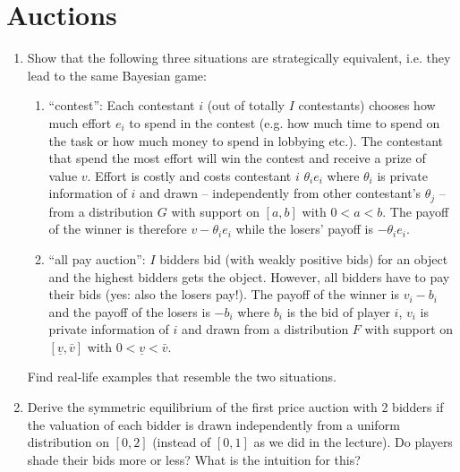 \documentclass[a4paper,12pt]{article}
\begin{document}
\section{Auctions}
\label{sec:auctions}

\begin{enumerate}
\item\label{ex:stratEq} Show that the following three situations are strategically equivalent, i.e. they lead to the same Bayesian game:
  \begin{enumerate}
  \item ``contest'': Each contestant $i$ (out of totally $I$ contestants) chooses how much effort $e_i$ to spend in the contest (e.g. how much time to spend on the task or how much money to spend in lobbying etc.). The contestant that spend the most effort will win the contest and receive a prize of value $v$. Effort is costly and costs contestant $i$ $\theta _ie_i$ where $\theta _i$ is private information of $i$ and drawn -- independently from other contestant's $\theta _j$ -- from a distribution $G$ with support on $[a,b]$ with $0<a<b$. The payoff of the winner is therefore $v-\theta _ie_i$ while the losers' payoff is $-\theta _ie_i$.
  \item ``all pay auction'': $I$ bidders bid (with weakly positive bids) for an object and the highest bidders gets the object. However, all bidders have to pay their bids (yes: also the losers pay!). The payoff of the winner is $v_i -b_i$ and the payoff of the losers is $-b_i$ where $b_i$ is the bid of player $i$, $v_i$ is private information of $i$ and drawn from a distribution $F$ with support on $[\underline{v},\bar{v}]$ with $0<\underline{v}<\bar{v}$.
  \end{enumerate}
  Find real-life examples that resemble the two situations.
\item Derive the symmetric equilibrium of the first price auction with 2 bidders if the valuation of each bidder is drawn independently from a uniform distribution on $[0,2]$ (instead of $[0,1]$ as we did in the lecture). Do players shade their bids more or less? What is the intuition for this?\\

\end{enumerate}
\end{document}
